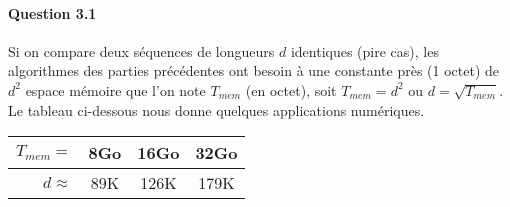 \paragraph{Question 3.1}
Si on compare deux s\'equences de longueurs $d$ identiques (pire cas),
les algorithmes des parties pr\'ec\'edentes ont besoin \`a une
constante pr\`es (1 octet) de $d^2$ espace m\'emoire que l'on note
$T_{mem}$ (en octet), soit $T_{mem}=d^2$ ou $d=\sqrt{T_{mem}}$. Le tableau
ci-dessous nous donne quelques applications num\'eriques.
\begin{table*}[h]
  \centering
  \begin{tabular}{rc|c|c}
    $T_{mem}=$&8Go&16Go&32Go\\
    \hline
    $d\approx$&89K&126K&179K
  \end{tabular}
\end{table*}

